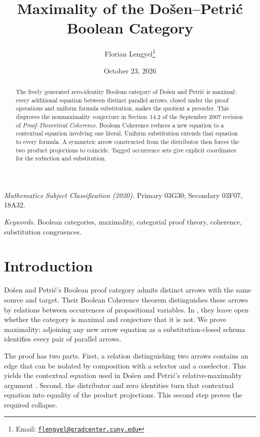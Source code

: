 \documentclass[11pt]{article}
\title{Maximality of the Do\v{s}en--Petri\'c Boolean Category}
\author{Florian Lengyel\thanks{Email: \href{mailto:flengyel@gradcenter.cuny.edu}{\texttt{flengyel@gradcenter.cuny.edu}}}}
\date{October 23, 2026}
\begin{document}
\maketitle

\begin{abstract}
The freely generated zero-identity Boolean category of Do\v{s}en and
Petri\'c is maximal: every additional equation between distinct parallel
arrows, closed under the proof operations and uniform formula
substitution, makes the quotient a preorder. This disproves the
nonmaximality conjecture in Section~14.2 of the September 2007 revision
of \emph{Proof-Theoretical Coherence}. Boolean Coherence reduces a new
equation to a contextual equation involving one literal. Uniform
substitution extends that equation to every formula. A symmetric arrow
constructed from the distributor then forces the two product
projections to coincide. Tagged occurrence sets give explicit
coordinates for the reduction and substitution.
\end{abstract}

\medskip
\noindent\textit{Mathematics Subject Classification (2020).}
Primary 03G30; Secondary 03F07, 18A32.

\smallskip
\noindent\textit{Keywords.} Boolean categories, maximality, categorial proof theory,
coherence, substitution congruences.

\section{Introduction}

Do\v{s}en and Petri\'c's Boolean proof category admits distinct arrows
with the same source and target. Their Boolean Coherence theorem
distinguishes these arrows by relations between occurrences of
propositional variables. In \cite[\S14.2, p.~322]{DP}, they leave open
whether the category is maximal and conjecture that it is not. We prove
maximality: adjoining any new arrow equation as a substitution-closed
schema identifies every pair of parallel arrows.

The proof has two parts. First, a relation distinguishing two arrows
contains an edge that can be isolated by composition with a selector
and a coselector. This yields the contextual equation used in
Do\v{s}en and Petri\'c's relative-maximality argument
\cite[\S9.7, pp.~215--216]{DP}. Second, the distributor and zero
identities turn that contextual equation into equality of the product
projections. This second step proves the required collapse.
\end{document}
